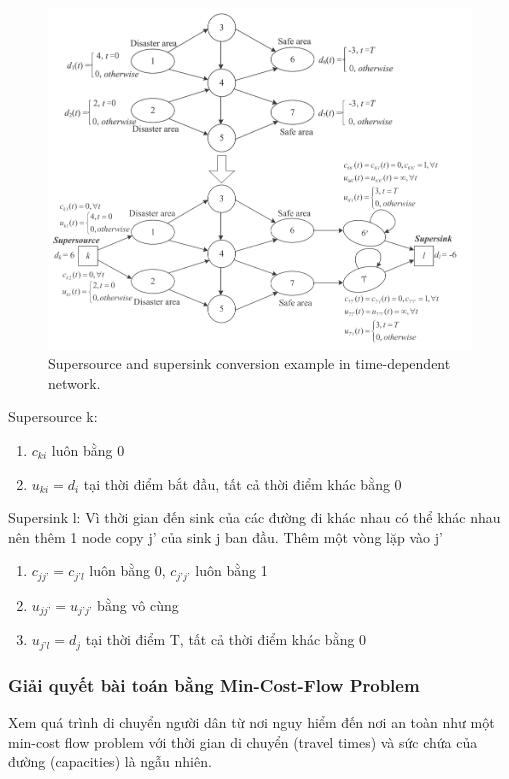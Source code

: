 \documentclass[a4paper]{article}
\begin{document}
\begin{enumerate}
\begin{figure}[h]
        \includegraphics[scale=0.6]{time_dependent_1.png}
        \caption{Supersource and supersink conversion example in time-dependent network.}
        \label{fig:enter-label}
    \end{figure}
\end{enumerate}
{Supersource k: }
\begin{enumerate}
    \item[] {$c_{ki}$ luôn bằng 0}
    \item[] {$u_{ki} = d_i$ tại thời điểm bắt đầu, tất cả thời điểm khác bằng 0}
\end{enumerate}
{Supersink l: Vì thời gian đến sink của các đường đi khác nhau có thể khác nhau nên thêm 1 node copy j’ của sink j ban đầu. Thêm một vòng lặp vào j’}
\begin{enumerate}
    \item[] {$c_{jj’} = c_{j’l}$ luôn bằng 0, $c_{j’j’}$ luôn bằng 1}
    \item[] {$u_{jj’} = u_{j’j’}$ bằng vô cùng}
    \item[] {$u_{j’l} = d_j$ tại thời điểm T, tất cả thời điểm khác bằng 0} 
\end{enumerate}
\subsubsection{Giải quyết bài toán bằng Min-Cost-Flow Problem}
{Xem quá trình di chuyển người dân từ nơi nguy hiểm đến nơi an toàn như một min-cost flow problem với thời gian di chuyển (travel times) và sức chứa của đường (capacities) là ngẫu nhiên.}
\end{document}
